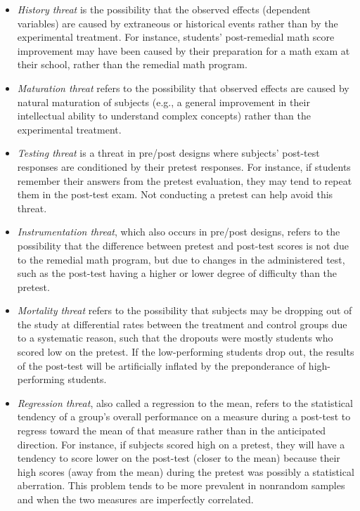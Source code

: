 \begin{itemize}
	\item \textit{History threat} is the possibility that the observed effects (dependent variables) are caused by extraneous or historical events rather than by the experimental treatment. For instance, students' post-remedial math score improvement may have been caused by their preparation for a math exam at their school, rather than the remedial math program.
	\item \textit{Maturation threat} refers to the possibility that observed effects are caused by natural maturation of subjects (e.g., a general improvement in their intellectual ability to understand complex concepts) rather than the experimental treatment.
	\item \textit{Testing threat} is a threat in pre/post designs where subjects' post-test responses are conditioned by their pretest responses. For instance, if students remember their answers from the pretest evaluation, they may tend to repeat them in the post-test exam. Not conducting a pretest can help avoid this threat.
	\item \textit{Instrumentation threat}, which also occurs in pre/post designs, refers to the possibility that the difference between pretest and post-test scores is not due to the remedial math program, but due to changes in the administered test, such as the post-test having a higher or lower degree of difficulty than the pretest.
	\item \textit{Mortality threat} refers to the possibility that subjects may be dropping out of the study at differential rates between the treatment and control groups due to a systematic reason, such that the dropouts were mostly students who scored low on the pretest. If the low-performing students drop out, the results of the post-test will be artificially inflated by the preponderance of high-performing students.
	\item \textit{Regression threat}, also called a regression to the mean, refers to the statistical tendency of a group's overall performance on a measure during a post-test to regress toward the mean of that measure rather than in the anticipated direction. For instance, if subjects scored high on a pretest, they will have a tendency to score lower on the post-test (closer to the mean) because their high scores (away from the mean) during the pretest was possibly a statistical aberration. This problem tends to be more prevalent in nonrandom samples and when the two measures are imperfectly correlated.
\end{itemize}

